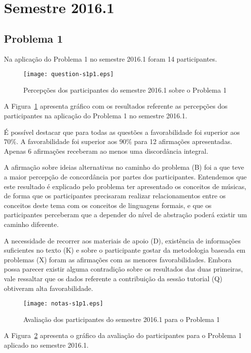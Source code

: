 \section{Semestre 2016.1}
\label{sec-sem-2016}
\subsection{Problema 1}
Na aplicação do Problema 1 no semestre 2016.1 foram 14 participantes.

\begin{figure}[!htb]
\centering
\texttt{[image: question-s1p1.eps]}
\caption{Percepções dos participantes do semestre 2016.1 sobre o Problema 1}
\label{percep-s1p1}
\end{figure}

A Figura~\ref{percep-s1p1} apresenta gráfico com os resultados referente
as percepções dos participantes na aplicação do
Problema 1 no semestre 2016.1.

É possível destacar que para todas as questões a favorabilidade
foi superior aos $70\%$. A favorabilidade foi superior aos $90\%$
para 12 afirmações apresentadas.
Apenas 6 afirmações receberam ao menos uma discordância integral.

A afirmação sobre ideias alternativas no caminho do problema (B)
foi a que teve a maior percepção de concordância por partes dos
participantes.
Entendemos que este resultado é explicado pelo problema
ter apresentado os conceitos de músicas, de forma que
os participantes precisaram realizar relacionamentos entre
os conceitos deste tema com os conceitos de linguagens
formais, e que os participantes perceberam que a depender do
nível de abstração poderá existir um caminho diferente.


A necessidade de recorrer aos materiais de apoio (D),
existência de informações suficientes no texto (K) e
sobre o participante gostar da metodologia baseada
em problemas (X) foram as afirmações com
as menores favorabilidades.
Embora possa parecer existir alguma contradição
sobre os resultados das duas primeiras, vale
ressaltar que os dados referente
a contribuição da sessão tutorial (Q) obtiveram
alta favorabilidade.

\begin{figure}[!htb]
\centering
\texttt{[image: notas-s1p1.eps]}
\caption{Avaliação dos participantes do semestre 2016.1 para o Problema 1}
\label{aval-s1p1}
\end{figure}

A Figura~\ref{aval-s1p1} apresenta o gráfico da
avaliação do participantes para o Problema 1 aplicado no semestre 2016.1.

